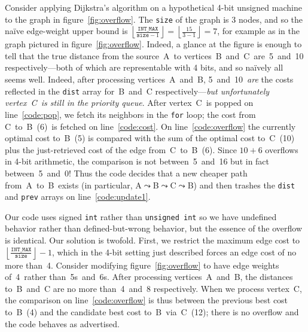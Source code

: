 Consider applying Dijkstra's algorithm on a hypothetical 4-bit unsigned machine to
the graph in figure~\ref{fig:overflow}.  The \texttt{size} of the graph is 3 nodes, and so the na\"ive edge-weight upper bound is $\left\lfloor\frac{\texttt{INT\_MAX}}{\texttt{size}-1}\right\rfloor = \left\lfloor\frac{15}{3-1}\right\rfloor = 7$, for example as in the graph pictured in figure~\ref{fig:overflow}.  Indeed, a glance at the figure is enough to tell that the true distance from the source~A~to vertices~B~and~C~are~5~and~10 respectively---both of which are representable with 4 bits, and so na\"ively all seems well.  %
Indeed, after processing vertices~A~and~B, 5~and~10~\emph{are} the costs reflected in the \texttt{dist} array for~B~and~C respectively---\emph{but unfortunately vertex~C~is still in the priority queue}.  After vertex~C~is popped on line~\ref{code:pop}, we fetch its neighbors in the \texttt{for} loop; the cost from C~to~B~(6)~is fetched on line~\ref{code:cost}.  On line~\ref{code:overflow} the currently optimal cost to~B~(5) is compared with the sum of the optimal cost to~C~(10) plus the just-retrieved cost of the edge from~C~to~B~(6).  Since $10+6$ overflows in 4-bit arithmetic, the comparison is not between~5~and~16 but in fact between~5~and~0!  Thus the code decides that a new cheaper path from~A~to~B~exists (in particular, A$\leadsto$B$\leadsto$C$\leadsto$B) and then trashes the \texttt{dist} and \texttt{prev} arrays on line~\ref{code:update1}.

Our code uses signed \texttt{int} rather than \texttt{unsigned int} so we have undefined behavior rather than defined-but-wrong behavior, but the essence of the overflow is identical.
Our solution is twofold.  First, we restrict the maximum edge cost to $\left\lfloor\frac{\texttt{INT\_MAX}}{\texttt{size}}\right\rfloor - 1$, which in the 4-bit setting just described forces an edge cost of no more than~4.  Consider modifying figure~\ref{fig:overflow} to
have edge weights of~4~rather than~5s~and~6s.  After processing vertices~A~and~B, the distances to~B~and~C are no more than~4~and~8 respectively.  When we process vertex~C, the comparison on line~\ref{code:overflow} is thus between the previous best cost to~B~(4) and the candidate best cost to~B~via~C~(12); there is no overflow and the code behaves as advertised.

